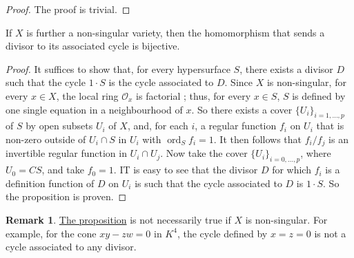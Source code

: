 \documentclass{article}
\theoremstyle{plain}
\newenvironment{proposition}[1]
    {\renewcommand\theinnercustomproposition{#1}\innercustomproposition}
    {\endinnercustomproposition}
\theoremstyle{definition}
\newtheorem*{remark}{Remark}
\newcommand{\sh}{\mathscr}
\DeclareMathOperator{\ord}{ord}
\newcommand{\oldpage}[1]{\marginpar{\footnotesize$\Big\vert$ \textit{p.~#1}}}
\begin{document}
\begin{proof}
  The proof is trivial.
\end{proof}

\begin{proposition}{10}
\label{proposition10}
  If $X$ is further a non-singular variety, then the homomorphism that sends a divisor to its associated cycle is bijective.
\end{proposition}

\oldpage{4-09}
\begin{proof}
  It suffices to show that, for every hypersurface $S$, there exists a divisor $D$ such that the cycle $1\cdot S$ is the cycle associated to $D$.
  Since $X$ is non-singular, for every $x\in X$, the local ring $\sh{O}_x$ is factorial \cite{3};
  thus, for every $x\in S$, $S$ is defined by one single equation in a neighbourhood of $x$.
  So there exists a cover $\{U_i\}_{i=1,\ldots,p}$ of $S$ by open subsets $U_i$ of $X$, and, for each $i$, a regular function $f_i$ on $U_i$ that is non-zero outside of $U_i\cap S$ in $U_i$ with $\ord_S f_i=1$.
  It then follows that $f_i/f_j$ is an invertible regular function in $U_i\cap U_j$.
  Now take the cover $\{U_i\}_{i=0,\ldots,p}$, where $U_0=CS$, and take $f_0=1$.
  IT is easy to see that the divisor $D$ for which $f_i$ is a definition function of $D$ on $U_i$ is such that the cycle associated to $D$ is $1\cdot S$.
  So the proposition is proven.
\end{proof}

\begin{remark}
  \hyperref[proposition10]{The proposition} is not necessarily true if $X$ is non-singular.
  For example, for the cone $xy-zw=0$ in $K^4$, the cycle defined by $x=z=0$ is not a cycle associated to any divisor.
\end{remark}



\nocite{*}

\end{document}
